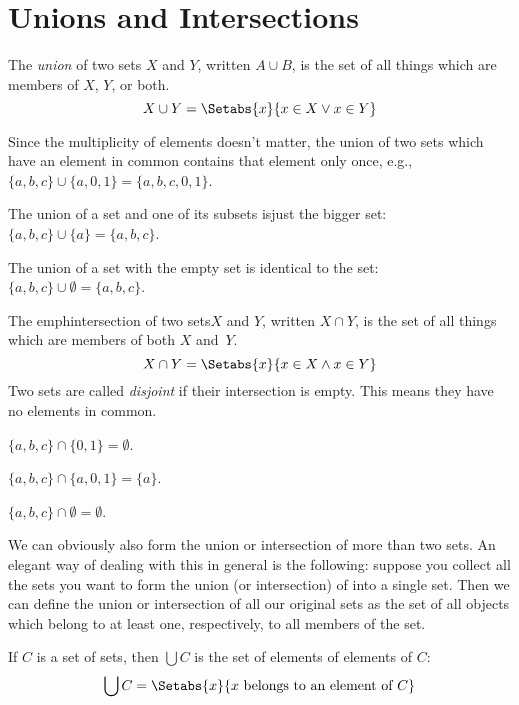 \documentclass[open-logic-section]{subfiles}
\begin{document}
\section{Unions and Intersections}

\begin{defn} 
The \emph{union} of two sets $X$ and $Y$, written $A \cup B$, is the
set of all things which are members of $X$, $Y$, or both.
\[
X \cup Y = \Setabs{x}{x \in X \lor x\in Y}
\]
\end{defn}

\begin{ex}
Since the multiplicity of elements doesn't matter, the union of two
sets which have an element in common contains that element only once,
e.g., $\{ a, b, c\} \cup \{ a, 0, 1\} = \{a, b, c, 0, 1\}$.

The union of a set and one of its subsets isjust the bigger set: $\{a,
b, c \} \cup \{a \} = \{a, b, c\}$.

The union of a set with the empty set is identical to the set: $\{a,
b, c \} \cup \emptyset = \{a, b, c \}$.
\end{ex}

\begin{defn}
The emph{intersection} of two sets$X$ and $Y$, written $X \cap Y$, is
the set of all things which are members of both $X$ and~$Y$. 
\[
X \cap Y = \Setabs{x}{x \in X \land x\in Y}
\]
Two sets are called \emph{disjoint} if their intersection is empty. This means
they have no elements in common.
\end{defn}

\begin{ex}
$\{ a, b, c\} \cap \{ 0, 1\} = \emptyset$.

$\{a, b, c \} \cap \{a, 0, 1 \} = \{a\}$.

$\{a, b, c \} \cap \emptyset = \emptyset$.
\end{ex}

\begin{wordy}
We can obviously also form the union or intersection of more than two
sets.  An elegant way of dealing with this in general is the
following: suppose you collect all the sets you want to form the union
(or intersection) of into a single set. Then we can define the union
or intersection of all our original sets as the set of all objects
which belong to at least one, respectively, to all members of the set.
\end{wordy}

\begin{defn}
If $C$ is a set of sets, then $\bigcup C$ is the set of elements of
elements of $C$:
\[
\bigcup C = \Setabs{x}{x \text{ belongs to an element of } C}
\]
\end{defn}
\end{document}
